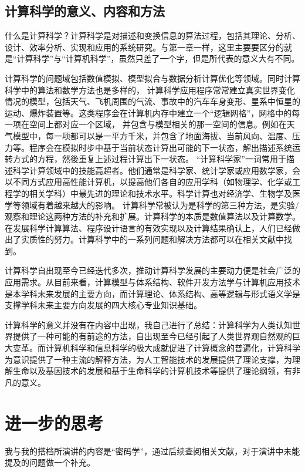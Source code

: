 \documentclass{article}
\begin{document}
\subsection{计算科学的意义、内容和方法}
什么是计算科学？计算科学是对描述和变换信息的算法过程，包括其理论、分析、设计、效率分析、实现和应用的系统研究。与第一章一样，这里主要要区分的就是“计算科学”与“计算机科学”，虽然只差了一个字，但是所代表的意义大有不同。\par
计算科学的问题域包括数值模拟、模型拟合与数据分析计算优化等领域。同时计算科学中的算法和数学方法也是多样的，
计算科学应用程序常常建立真实世界变化情况的模型，包括天气、飞机周围的气流、事故中的汽车车身变形、星系中恒星的运动、爆炸装置等。这类程序会在计算机内存中建立一个“逻辑网格”，网格中的每一项在空间上都对应一个区域，
并包含与模型相关的那一空间的信息。例如在天气模型中，每一项都可以是一平方千米，并包含了地面海拔、当前风向、温度、压力等。程序会在模拟时步中基于当前状态计算出可能的下一状态，解出描述系统运转方式的方程，然後重复上述过程计算出下一状态。
“计算科学家”一词常用于描述科学计算领域中的技能高超者。他们通常是科学家、统计学家或应用数学家，会以不同方式应用高性能计算机，以提高他们各自的应用学科（如物理学、化学或工程学的相关学科）中最先进的理论和技术水平。科学计算也对经济学、生物学及医学等领域有着越来越大的影响。
计算科学常被认为是科学的第三种方法，是实验/观察和理论这两种方法的补充和扩展。计算科学的本质是数值算法以及计算数学。在发展科学计算算法、程序设计语言的有效实现以及计算结果确认上，人们已经做出了实质性的努力。计算科学中的一系列问题和解决方法都可以在相关文献中找到。\citep{zxx}\par
计算科学自出现至今已经迭代多次，推动计算科学发展的主要动力便是社会广泛的应用需求。从目前来看，计算模型与体系结构、软件开发方法学与计算机应用技术是本学科未来发展的主要方向，而计算理论、体系结构、高等逻辑与形式语义学是支撑学科未来主要方向发展的四大核心专业知识基础。\par
计算科学的意义并没有在内容中出现，我自己进行了总结：计算科学为人类认知世界提供了一种可能的有前途的方法，自出现至今已经引起了人类世界观自然观的巨大变革。而计算机科学和信息科学的极大成就促进了计算概念的普遍化，计算科学为意识提供了一种主流的解释方法，为人工智能技术的发展提供了理论支撑，为理解生命以及基因技术的发展和基于生命科学的计算机技术等提供了理论纲领，有非凡的意义。

\section{进一步的思考}
我与我的搭档所演讲的内容是“密码学”，通过后续查阅相关文献，对于演讲中未能提及的问题做一个补充。\par
\end{document}

